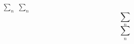 \documentclass{article}
\begin{document}
$ \sum_n $
$ \sum_{n}$
\[
\sum_{n}
\]
\[
\sum_n
\]
\end{document}
